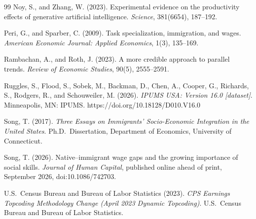 \documentclass[11pt]{amsart}
\begin{document}
\begin{thebibliography}{99}
Noy, S., and Zhang, W. (2023). Experimental evidence on the productivity effects of generative artificial intelligence. \emph{Science}, 381(6654), 187--192.

Peri, G., and Sparber, C. (2009). Task specialization, immigration, and wages. \emph{American Economic Journal: Applied Economics}, 1(3), 135--169.

Rambachan, A., and Roth, J. (2023). A more credible approach to parallel trends. \emph{Review of Economic Studies}, 90(5), 2555--2591.

Ruggles, S., Flood, S., Sobek, M., Backman, D., Chen, A., Cooper, G., Richards, S., Rodgers, R., and Schouweiler, M. (2026). \emph{IPUMS USA: Version 16.0 [dataset]}. Minneapolis, MN: IPUMS. https://doi.org/10.18128/D010.V16.0

Song, T. (2017). \emph{Three Essays on Immigrants' Socio-Economic Integration in the United States}. Ph.D.\ Dissertation, Department of Economics, University of Connecticut.

Song, T. (2026). Native--immigrant wage gaps and the growing importance of social skills. \emph{Journal of Human Capital}, published online ahead of print, September 2026, doi:10.1086/742703.

U.S.\ Census Bureau and Bureau of Labor Statistics (2023). \emph{CPS Earnings Topcoding Methodology Change (April 2023 Dynamic Topcoding)}. U.S.\ Census Bureau and Bureau of Labor Statistics.

\end{thebibliography}
\end{document}

